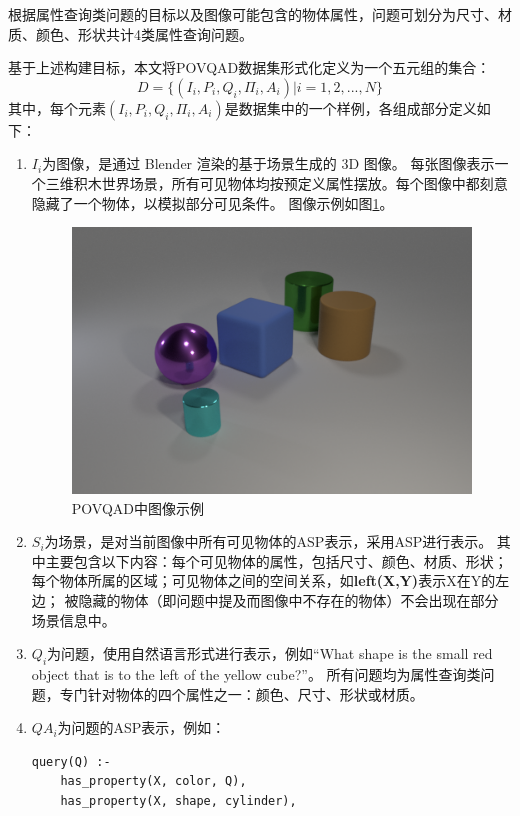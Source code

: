 \begin{enumerate}[nosep]
根据属性查询类问题的目标以及图像可能包含的物体属性，问题可划分为尺寸、材质、颜色、形状共计4类属性查询问题。
\end{enumerate}

基于上述构建目标，本文将POVQAD数据集形式化定义为一个五元组的集合：
$$D = \{ (I_i,P_i,Q_i,\Pi_i ,A_i) | i=1,2,...,N \}$$
其中，每个元素$(I_i,P_i,Q_i,\Pi_i ,A_i)$是数据集中的一个样例，各组成部分定义如下：
\begin{enumerate}[nosep]
\item \textbf{$I_i$}为图像，是通过 Blender 渲染的基于场景生成的 3D 图像。
每张图像表示一个三维积木世界场景，所有可见物体均按预定义属性摆放。每个图像中都刻意隐藏了一个物体，以模拟部分可见条件。
图像示例如图\ref{POVQAD-figure}。
\begin{figure}
\centering
\includegraphics[scale=0.6]{figures/POVQAD中图像示例.png}
\caption{POVQAD中图像示例}
\label{POVQAD-figure}
\end{figure}
\item \textbf{$S_i$}为场景，是对当前图像中所有可见物体的ASP表示，采用ASP进行表示。
其中主要包含以下内容：每个可见物体的属性，包括尺寸、颜色、材质、形状；每个物体所属的区域；可见物体之间的空间关系，如\textbf{left(X,Y)}表示X在Y的左边；
被隐藏的物体（即问题中提及而图像中不存在的物体）不会出现在部分场景信息中。
\item \textbf{$Q_i$}为问题，使用自然语言形式进行表示，例如“What shape is the small red object that is to the left of the yellow cube?”。
所有问题均为属性查询类问题，专门针对物体的四个属性之一：颜色、尺寸、形状或材质。
\item \textbf{$QA_i$}为问题的ASP表示，例如：
\begin{lstlisting}
query(Q) :-
    has_property(X, color, Q),
    has_property(X, shape, cylinder),

\end{lstlisting}
\end{enumerate}
